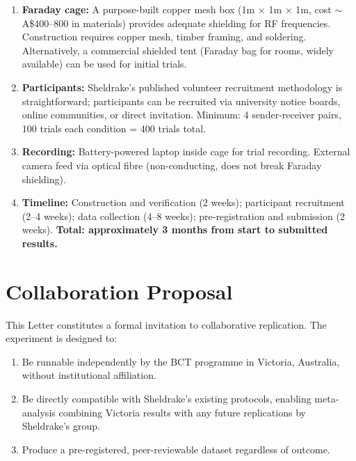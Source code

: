 \documentclass[aps,prl,twocolumn,superscriptaddress,floatfix]{revtex4-2}
\begin{document}
\begin{enumerate}
\item \textbf{Faraday cage:} A purpose-built copper mesh box
    (1m $\times$ 1m $\times$ 1m, cost $\sim$A\$400--800 in materials)
    provides adequate shielding for RF frequencies. Construction
    requires copper mesh, timber framing, and soldering.
    Alternatively, a commercial shielded tent (Faraday bag for
    rooms, widely available) can be used for initial trials.

\item \textbf{Participants:} Sheldrake's published volunteer recruitment
    methodology is straightforward; participants can be recruited via
    university notice boards, online communities, or direct invitation.
    Minimum: 4 sender-receiver pairs, 100 trials each
    condition = 400 trials total.

\item \textbf{Recording:} Battery-powered laptop inside cage for
    trial recording. External camera feed via optical fibre
    (non-conducting, does not break Faraday shielding).

\item \textbf{Timeline:} Construction and verification (2 weeks);
    participant recruitment (2--4 weeks); data collection (4--8 weeks);
    pre-registration and submission (2 weeks).
    \textbf{Total: approximately 3 months from start to submitted
    results.}
\end{enumerate}

\section{Collaboration Proposal}

This Letter constitutes a formal invitation to collaborative
replication. The experiment is designed to:
\begin{enumerate}
\item Be runnable independently by the BCT programme in Victoria,
    Australia, without institutional affiliation.
\item Be directly compatible with Sheldrake's existing protocols,
    enabling meta-analysis combining Victoria results with any
    future replications by Sheldrake's group.
\item Produce a pre-registered, peer-reviewable dataset regardless
    of outcome.
\end{enumerate}
\end{document}

